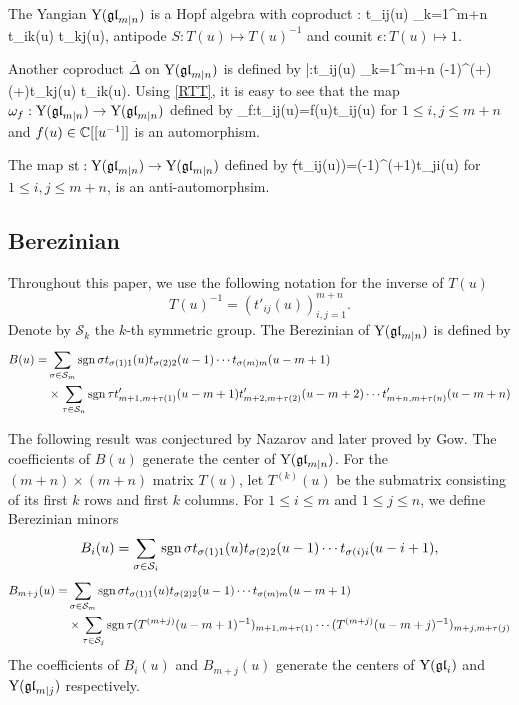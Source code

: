 \documentclass[12pt]{amsart}
\begin{document}
The Yangian ${\rm Y}(\mathfrak{gl}_{m|n})$ is a Hopf algebra with coproduct
\Delta : t_{ij}(u)  \mapsto \sum_{k=1}^{m+n} t_{ik}(u)  \otimes t_{kj}(u),
\eeq
antipode $S: T(u) \mapsto T(u)^{-1}$ and counit $\epsilon : T(u) \mapsto 1$.

Another coproduct $\bar{\Delta}$ on ${\rm Y}(\mathfrak{gl}_{m|n})$ is defined by
\bar{\De}:t_{ij}(u)  \mapsto \sum_{k=1}^{m+n} (-1)^{(\bi+\bk)(\bj+\bk)}t_{kj}(u)  \otimes t_{ik}(u).
\eeq
 Using \eqref{RTT}, it is easy to see that
the map $\omega_f:{\rm Y}(\mathfrak{gl}_{m|n})\rightarrow {\rm Y}(\mathfrak{gl}_{m|n})$ defined by
\om_f:t_{ij}(u)=f(u)t_{ij}(u)
\eeq
for $1\leq i,j\leq m+n$ and $f(u)\in \mathbb{C}[[u^{-1}]]$ is an automorphism.

\label{pro:anti-auto}
The map ${\rm st}:{\rm Y}(\mathfrak{gl}_{m|n})\rightarrow {\rm Y}(\mathfrak{gl}_{m|n})$ defined by
\st(t_{ij}(u))=(-1)^{\bi(\bj+1)}t_{ji}(u)
\eeq
for $1\leq i,j\leq m+n$, is an anti-automorphsim.
\epr


\subsection{Berezinian}
Throughout this paper, we use the following notation for  the inverse of $T(u)$
\[
T(u)^{-1}=\left(t'_{ij}(u)\right)_{i,j=1}^{m+n}.
\]
Denote by $\mathcal{S}_k$ the $k$-th symmetric group.
\bde
The Berezinian of ${\rm Y}(\mathfrak{gl}_{m|n})$ is defined by
\begin{equation}\label{bere}
\begin{split}
B(u)=&\sum_{\sigma\in \mathcal{S}_m}{\rm sgn}\,\sigma t_{\sigma(1)1}(u)t_{\sigma(2)2}(u-1)\cdots t_{\sigma(m)m}(u-m+1)\\
&\times \sum_{\tau\in \mathcal{S}_n}{\rm sgn}\,\tau t'_{m+1,m+\tau(1)}(u-m+1)t'_{m+2,m+\tau(2)}(u-m+2)\cdots t'_{m+n,m+\tau(n)}(u-m+n)
\end{split}
\end{equation}
\ede

The following result was conjectured by Nazarov\cite{Naz 1991} and later proved by Gow\cite{Gow 2007}.
\label{thm:B}
The coefficients of $B(u)$ generate the center of ${\rm Y}(\mathfrak{gl}_{m|n})$.
\eth
For the $(m+n)\times (m+n)$ matrix $T(u)$, let $T^{(k)}(u)$ be the submatrix consisting of its first $k$ rows and first $k$ columns.
For $1\leq i\leq m$ and $1\leq j\leq n$, we define Berezinian minors
\[
B_i(u)=\sum_{\sigma\in \mathcal{S}_i}{\rm sgn}\,\sigma t_{\sigma(1)1}(u)t_{\sigma(2)2}(u-1)\cdots t_{\sigma(i)i}(u-i+1),
\]
\[
\begin{split}
B_{m+j}(u)=&\sum_{\sigma\in \mathcal{S}_m}{\rm sgn}\,\sigma t_{\sigma(1)1}(u)t_{\sigma(2)2}(u-1)\cdots t_{\sigma(m)m}(u-m+1)\\
&\times \sum_{\tau\in \mathcal{S}_j}{\rm sgn}\,\tau (T^{(m+j)}(u-m+1)^{-1})_{m+1,m+\tau(1)}\cdots (T^{(m+j)}(u-m+j)^{-1})_{m+j,m+\tau(j)}
\end{split}
\]
The coefficients of $B_i(u)$ and $B_{m+j}(u)$ generate the centers of ${\rm Y}(\mathfrak{gl}_i)$ and ${\rm Y}(\mathfrak{gl}_{m|j})$ respectively.
\end{document}
